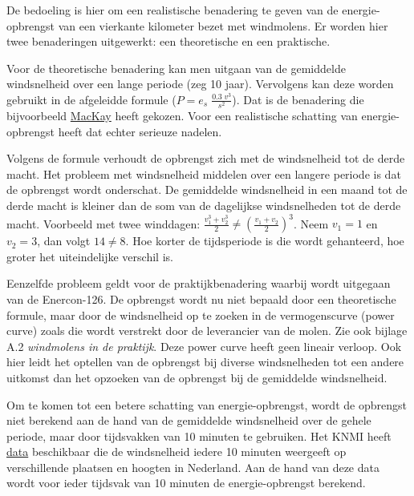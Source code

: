 \documentclass[
  11pt,
  a4paper,
]{book}
\begin{document}
\medskip

De bedoeling is hier om een realistische benadering te geven van de energie-opbrengst van een vierkante kilometer bezet met windmolens. Er worden hier twee benaderingen uitgewerkt: een theoretische en een praktische.

\medskip

Voor de theoretische benadering kan men uitgaan van de gemiddelde windsnelheid over een lange periode (zeg 10 jaar). Vervolgens kan deze worden gebruikt in de afgeleidde formule (\(P = e_s \; \frac{0.3\;v^3}{s^2}\)). Dat is de benadering die bijvoorbeeld \href{https://www.withouthotair.com/download.html}{MacKay} heeft gekozen. Voor een realistische schatting van energie-opbrengst heeft dat echter serieuze nadelen.

Volgens de formule verhoudt de opbrengst zich met de windsnelheid tot de derde macht. Het probleem met windsnelheid middelen over een langere periode is dat de opbrengst wordt onderschat. De gemiddelde windsnelheid in een maand tot de derde macht is kleiner dan de som van de dagelijkse windsnelheden tot de derde macht. Voorbeeld met twee winddagen: \(\frac{v_1^3 + v_2^3}{2} \neq (\frac{v_1+v_2}{2})^3\). Neem \(v_1=1\) en \(v_2=3\), dan volgt \(14 \neq 8\). Hoe korter de tijdsperiode is die wordt gehanteerd, hoe groter het uiteindelijke verschil is.

\medskip

Eenzelfde probleem geldt voor de praktijkbenadering waarbij wordt uitgegaan van de Enercon-126. De opbrengst wordt nu niet bepaald door een theoretische formule, maar door de windsnelheid op te zoeken in de vermogenscurve (power curve) zoals die wordt verstrekt door de leverancier van de molen. Zie ook bijlage A.2 \emph{windmolens in de praktijk}. Deze power curve heeft geen lineair verloop. Ook hier leidt het optellen van de opbrengst bij diverse windsnelheden tot een andere uitkomst dan het opzoeken van de opbrengst bij de gemiddelde windsnelheid.

\medskip

Om te komen tot een betere schatting van energie-opbrengst, wordt de opbrengst niet berekend aan de hand van de gemiddelde windsnelheid over de gehele periode, maar door tijdsvakken van 10 minuten te gebruiken. Het KNMI heeft \href{https://dataplatform.knmi.nl/dataset/cesar-tower-meteo-lc1-t10-v1-0}{data} beschikbaar die de windsnelheid iedere 10 minuten weergeeft op verschillende plaatsen en hoogten in Nederland. Aan de hand van deze data wordt voor ieder tijdsvak van 10 minuten de energie-opbrengst berekend.
\end{document}
